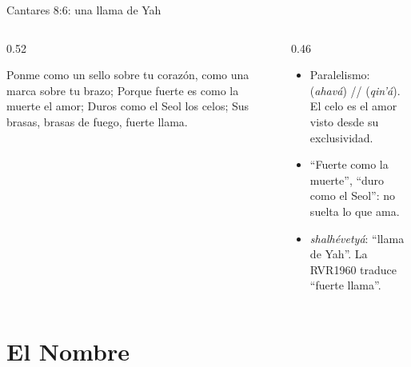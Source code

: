 \begin{frame}{Cantares 8:6: una llama de Yah}
\begin{columns}[c,onlytextwidth]
\begin{column}{0.52\textwidth}
\begin{cita}Ponme como un sello sobre tu corazón, como una marca sobre tu brazo; Porque fuerte es como la muerte el amor; Duros como el Seol los celos; Sus brasas, brasas de fuego, fuerte llama.\end{cita}
\begin{center}\\[2pt]\\[2pt]\end{center}
\end{column}
\begin{column}{0.46\textwidth}\small
\begin{itemize}
\item Paralelismo:  (\emph{ahavá}) //  (\emph{qin'á}). El celo es el amor visto desde su exclusividad.
\item ``Fuerte como la muerte'', ``duro como el Seol'': no suelta lo que ama.
\item {} \emph{shalhévetyá}: ``llama de Yah''. La RVR1960 traduce ``fuerte llama''.
\end{itemize}
\end{column}
\end{columns}
\end{frame}

\section{El Nombre}

